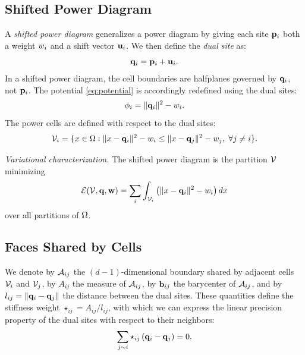 \documentclass[11pt,a4paper]{article}
\begin{document}
\subsection{Shifted Power Diagram}\label{sec:shifted-pd}

A \emph{shifted power diagram} generalizes a power diagram by giving each site $\mathbf{p}_i$ both a weight $w_i$ and a shift vector $\mathbf{u}_i$.
We then define the \emph{dual site} as:
\begin{equation}
  \mathbf{q}_i = \mathbf{p}_i + \mathbf{u}_i.
\end{equation}
In a shifted power diagram, the cell boundaries are halfplanes governed by $\mathbf{q}_i$, not $\mathbf{p}_i$.
The potential \eqref{eq:potential} is accordingly redefined using the dual sites:
\begin{equation}\label{eq:potential-shifted}
  \phi_i = \|\mathbf{q}_i\|^2 - w_i.
\end{equation}
The power cells are defined with respect to the dual sites:
\begin{equation}
  \mathcal{V}_i = \{x \in \Omega : \|x - \mathbf{q}_i\|^2 - w_i \leq \|x - \mathbf{q}_j\|^2 - w_j,\; \forall j \neq i\}.
\end{equation}

\emph{Variational characterization.} The shifted power diagram is the partition $\mathcal{V}$ minimizing
\begin{equation}
\label{eq:spdEnergy}
\mathcal{E}(\mathcal{V}, \mathbf{q}, \mathbf{w}) = \sum_i \int_{\mathcal{V}_i} \left(\|x - \mathbf{q}_i\|^2 - w_i\right) dx
\end{equation}
over all partitions of $\Omega$.


\subsection{Faces Shared by Cells}
\label{sec:faces}

We denote by $\mathcal{A}_{ij}$ the $(d\!-\!1)$-dimensional boundary shared by adjacent cells ${\mathcal{V}}_i$ and ${\mathcal{V}}_j$, by $A_{ij}$ the measure of $\mathcal{A}_{ij}$, by $\mathbf{b}_{ij}$ the barycenter of $\mathcal{A}_{ij}$, and by $l_{ij} = \|{\mathbf{q}}_i - {\mathbf{q}}_j\|$ the distance between the dual sites. 
These quantities define the stiffness weight $\star_{ij} = A_{ij}/l_{ij}$, with which we can express the linear precision property of the dual sites with respect to their neighbors:
\begin{equation}
\label{eq:linear_precision}
\sum_{j \sim i} \star_{ij} \left(\mathbf{q}_i - \mathbf{q}_j\right) = 0.
\end{equation}
\end{document}
